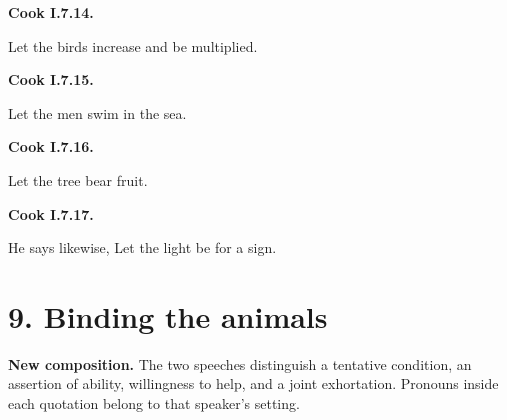 \par\begin{minipage}{\linewidth}\raggedright
\textbf{Cook I.7.14.}

Let the birds increase and be multiplied.

\end{minipage}\par\addvspace{4pt}

\par\begin{minipage}{\linewidth}\raggedright
\textbf{Cook I.7.15.}

Let the men swim in the sea.

\end{minipage}\par\addvspace{4pt}

\par\begin{minipage}{\linewidth}\raggedright
\textbf{Cook I.7.16.}

Let the tree bear fruit.

\end{minipage}\par\addvspace{4pt}

\par\begin{minipage}{\linewidth}\raggedright
\textbf{Cook I.7.17.}

He says likewise, Let the light be for a sign.

\end{minipage}\par\addvspace{4pt}

\section*{9. Binding the animals}

\textbf{New composition.} The two speeches distinguish a tentative condition, an assertion of ability, willingness to help, and a joint exhortation. Pronouns inside each quotation belong to that speaker’s setting.

